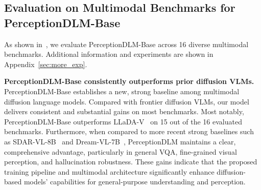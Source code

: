 \vspace{-2mm}
\subsection{Evaluation on Multimodal Benchmarks for PerceptionDLM-Base}
\vspace{-2mm}
As shown in~, we evaluate PerceptionDLM-Base across 16 diverse multimodal benchmarks. Additional information and experiments are shown in Appendix~\ref{sec:more_exp}.

\noindent
\textbf{PerceptionDLM-Base consistently outperforms prior diffusion VLMs.}
PerceptionDLM-Base establishes a new, strong baseline among multimodal diffusion language models. Compared with frontier diffusion VLMs, our model delivers consistent and substantial gains on most benchmarks. Most notably, PerceptionDLM-Base outperforms LLaDA-V~\citep{you2025llada} on 15 out of the 16 evaluated benchmarks. Furthermore, when compared to more recent strong baselines such as SDAR-VL-8B~\citep{cheng2025sdar} and Dream-VL-7B~\citep{ye2025dream}, PerceptionDLM maintains a clear, comprehensive advantage, particularly in general VQA, fine-grained visual perception, and hallucination robustness.
%
These gains indicate that the proposed training pipeline and multimodal architecture significantly enhance diffusion-based models' capabilities for general-purpose understanding and perception.

